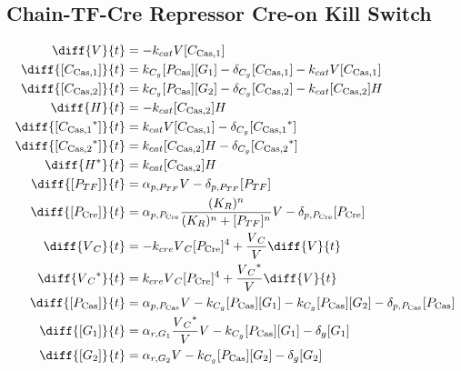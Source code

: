 \subsection{Chain-TF-Cre Repressor Cre-on Kill Switch}
\label{s:Chain_TF_Cre_Repressor_Cre_on_Kill_Switch}

\begin{align}
\diff{\vectorGen{}}{t} & = - \casCutRate{{}}\vectorGen{}\conc{\cplx{\cas}{1}}\\
\diff{\conc{\cplx{\cas}{1}}}{t} & =  \gRnaBind{}\conc{\proSp{\cas{}}}\conc{\gRna{1}} - \casCompDegradeRate{}\conc{\cplx{\cas}{1}} - \casCutRate{{}}\vectorGen{}\conc{\cplx{\cas}{1}}\\
\diff{\conc{\cplx{\cas}{2}}}{t} & =  \gRnaBind{}\conc{\proSp{\cas{}}}\conc{\gRna{2}} - \casCompDegradeRate{}\conc{\cplx{\cas}{2}} - \casCutRate{{}}\conc{\cplx{\cas}{2}}\hostGen{}\\
\diff{\hostGen{}}{t} & = - \casCutRate{{}}\conc{\cplx{\cas}{2}}\hostGen{}\\
\diff{\conc{\bound{\cplx{\cas}{1}}}}{t} & =  \casCutRate{{}}\vectorGen{}\conc{\cplx{\cas}{1}} - \casCompDegradeRate{}\conc{\bound{\cplx{\cas}{1}}}\\
\diff{\conc{\bound{\cplx{\cas}{2}}}}{t} & =  \casCutRate{{}}\conc{\cplx{\cas}{2}}\hostGen{} - \casCompDegradeRate{}\conc{\bound{\cplx{\cas}{2}}}\\
\diff{\edited{\hostGen{}}}{t} & =  \casCutRate{{}}\conc{\cplx{\cas}{2}}\hostGen{}\\
\diff{\conc{\proSp{TF}}}{t} & =  \txtlRate{\proSp{TF}}\vectorGen{} - \proDegradeRate{\proSp{TF}}\conc{\proSp{TF}}\\
\diff{\conc{\proSp{\cre{}}}}{t} & =  \txtlRate{\proSp{\cre{}}}\frac{(K_R)^n}{(K_R)^n + \conc{\proSp{TF}}^n}\vectorGen{} - \proDegradeRate{\proSp{\cre{}}}\conc{\proSp{\cre{}}}\\
\diff{\vectorGen{}_C}{t} & = - \creCutRate{} \vectorGen{}_C \conc{\proSp{\cre{}}}^4 + \frac{\vectorGen{}_C}{\vectorGen{}} \diff{\vectorGen{}}{t}\\
\diff{\edited{\vectorGen{}_C}}{t} & =  \creCutRate{} \vectorGen{}_C \conc{\proSp{\cre{}}}^4 + \frac{\edited{\vectorGen{}_C}}{\vectorGen{}} \diff{\vectorGen{}}{t}\\
\diff{\conc{\proSp{\cas{}}}}{t} & =  \txtlRate{\proSp{\cas{}}}\vectorGen{} - \gRnaBind{}\conc{\proSp{\cas{}}}\conc{\gRna{1}} - \gRnaBind{}\conc{\proSp{\cas{}}}\conc{\gRna{2}} - \proDegradeRate{\proSp{\cas{}}}\conc{\proSp{\cas{}}}\\
\diff{\conc{\gRna{1}}}{t} & =  \txRate{\gRna{1}}\frac{\edited{\vectorGen{}_C}}{\vectorGen{}}\vectorGen{} - \gRnaBind{}\conc{\proSp{\cas{}}}\conc{\gRna{1}} - \rnaDegradeRate{}\conc{\gRna{1}}\\
\diff{\conc{\gRna{2}}}{t} & =  \txRate{\gRna{2}}\vectorGen{} - \gRnaBind{}\conc{\proSp{\cas{}}}\conc{\gRna{2}} - \rnaDegradeRate{}\conc{\gRna{2}}
\end{align}

